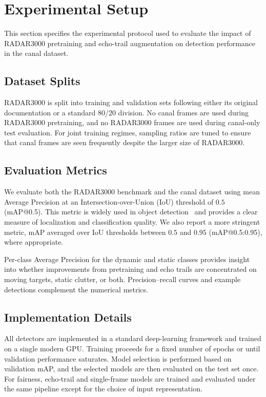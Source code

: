 \documentclass[conference]{IEEEtran}
\begin{document}
\section{Experimental Setup}
\label{sec:setup}
This section specifies the experimental protocol used to evaluate the impact of RADAR3000 pretraining and echo-trail augmentation on detection performance in the canal dataset.

\subsection{Dataset Splits}
RADAR3000 is split into training and validation sets following either its original documentation or a standard $80$/$20$ division. No canal frames are used during RADAR3000 pretraining, and no RADAR3000 frames are used during canal-only test evaluation. For joint training regimes, sampling ratios are tuned to ensure that canal frames are seen frequently despite the larger size of RADAR3000.

\subsection{Evaluation Metrics}
We evaluate both the RADAR3000 benchmark and the canal dataset using mean Average Precision at an Intersection-over-Union (IoU) threshold of $0.5$ (mAP@0.5). This metric is widely used in object detection~\cite{lin2014coco, everingham2010pascal_voc} and provides a clear measure of localization and classification quality. We also report a more stringent metric, mAP averaged over IoU thresholds between $0.5$ and $0.95$ (mAP@0.5:0.95), where appropriate.

Per-class Average Precision for the dynamic and static classes provides insight into whether improvements from pretraining and echo trails are concentrated on moving targets, static clutter, or both. Precision--recall curves and example detections complement the numerical metrics.

\subsection{Implementation Details}
All detectors are implemented in a standard deep-learning framework and trained on a single modern GPU. Training proceeds for a fixed number of epochs or until validation performance saturates. Model selection is performed based on validation mAP, and the selected models are then evaluated on the test set once. For fairness, echo-trail and single-frame models are trained and evaluated under the same pipeline except for the choice of input representation.
\end{document}
